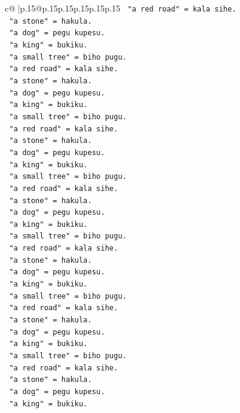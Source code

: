 \documentclass{article}
\begin{document}
{\begin{supertabular}{c@{$\;$}|p{.15\linewidth}@{}p{.15\linewidth}p{.15\linewidth}p{.15\linewidth}p{.15\linewidth}p{.15\linewidth}}
{{{\texttt{   "a red road" = kala sihe.} \\
\texttt{   "a stone" = hakula.} \\
\texttt{   "a dog" = pegu kupesu.} \\
\texttt{   "a king" = bukiku.} \\
\texttt{   "a small tree" = biho pugu.} \\
\texttt{   "a red road" = kala sihe.} \\
\texttt{   "a stone" = hakula.} \\
\texttt{   "a dog" = pegu kupesu.} \\
\texttt{   "a king" = bukiku.} \\
\texttt{   "a small tree" = biho pugu.} \\
\texttt{   "a red road" = kala sihe.} \\
\texttt{   "a stone" = hakula.} \\
\texttt{   "a dog" = pegu kupesu.} \\
\texttt{   "a king" = bukiku.} \\
\texttt{   "a small tree" = biho pugu.} \\
\texttt{   "a red road" = kala sihe.} \\
\texttt{   "a stone" = hakula.} \\
\texttt{   "a dog" = pegu kupesu.} \\
\texttt{   "a king" = bukiku.} \\
\texttt{   "a small tree" = biho pugu.} \\
\texttt{   "a red road" = kala sihe.} \\
\texttt{   "a stone" = hakula.} \\
\texttt{   "a dog" = pegu kupesu.} \\
\texttt{   "a king" = bukiku.} \\
\texttt{   "a small tree" = biho pugu.} \\
\texttt{   "a red road" = kala sihe.} \\
\texttt{   "a stone" = hakula.} \\
\texttt{   "a dog" = pegu kupesu.} \\
\texttt{   "a king" = bukiku.} \\
\texttt{   "a small tree" = biho pugu.} \\
\texttt{   "a red road" = kala sihe.} \\
\texttt{   "a stone" = hakula.} \\
\texttt{   "a dog" = pegu kupesu.} \\
\texttt{   "a king" = bukiku.} \\
}}}
\end{supertabular}}
\end{document}
